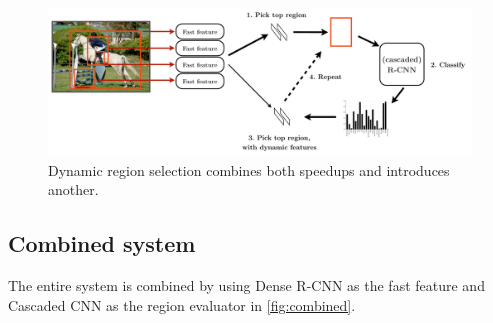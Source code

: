 \begin{figure}[h!]
\begin{center}
\includegraphics[width=0.98\columnwidth]{figures/combined.pdf}
\caption{
Dynamic region selection combines both speedups and introduces another.
}\label{fig:combined}
\end{center}
\end{figure}

\subsection{Combined system}\label{combined-system}

The entire system is combined by using Dense R-CNN as the fast feature and Cascaded CNN as the region evaluator in \autoref{fig:combined}.
